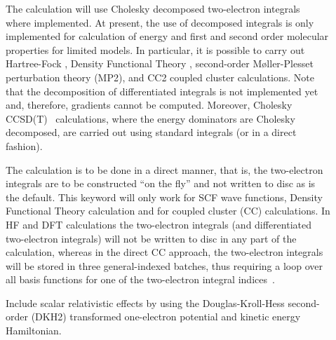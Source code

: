 \begin{description}

\item[] The calculation will use Cholesky decomposed two-electron
integrals~\cite{choint} where implemented.
At present, the use of decomposed integrals is only implemented for calculation of energy and
first and second order molecular properties for limited models.
In particular, it is possible to carry out Hartree-Fock
,
Density Functional Theory
,
second-order M{\o}ller-Plesset perturbation theory
(MP2), and
CC2 coupled cluster calculations. Note that
the decomposition of differentiated integrals is not implemented yet and, therefore,
gradients cannot be computed. Moreover, Cholesky CCSD(T)~
calculations, where the energy dominators are Cholesky decomposed,
are carried out using standard integrals (or in a direct fashion).


\item[] The calculation is to be done in a direct
manner, that
is, the two-electron integrals are to be
constructed ``on the fly''
and not written to disc as is the default. This keyword will only work
for SCF wave functions,
Density Functional Theory
calculation and for
coupled cluster (CC) calculations. In
HF and DFT calculations the
two-electron integrals (and differentiated
two-electron integrals) will not be written to disc in any part of the
calculation, whereas in the direct CC approach, the two-electron
integrals will be stored in three general-indexed batches, thus
requiring a loop over all basis functions for one of the two-electron
integral indices~\cite{directCC}.

\item[] Include scalar relativistic effects by using the
Douglas-Kroll-Hess second-order (DKH2) transformed one-electron potential and kinetic energy Hamiltonian.



\end{description}
